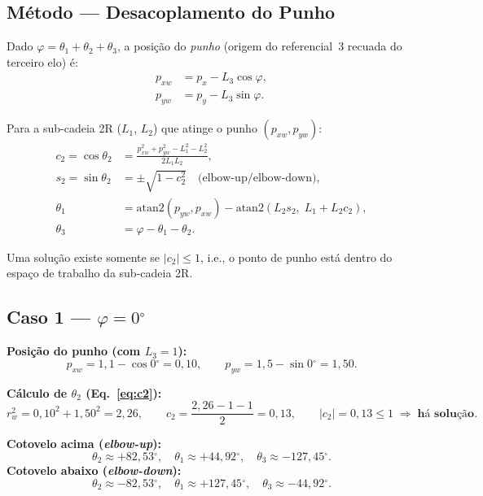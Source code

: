 \documentclass[12pt,a4paper]{article}
\newcommand{\degr}{\ensuremath{^{\circ}}}
\begin{document}
\subsection{M\'etodo --- Desacoplamento do Punho}

Dado $\varphi = \theta_1+\theta_2+\theta_3$, a posi\c{c}\~ao do \emph{punho} (origem
do referencial~3 recuada do terceiro elo) \'e:
\begin{align}
  p_{xw} &= p_x - L_3\cos\varphi, \label{eq:pxw}\\
  p_{yw} &= p_y - L_3\sin\varphi. \label{eq:pyw}
\end{align}

Para a sub-cadeia 2R ($L_1$, $L_2$) que atinge o punho $(p_{xw},p_{yw})$:
\begin{align}
  c_2 = \cos\theta_2 &= \frac{p_{xw}^2 + p_{yw}^2 - L_1^2 - L_2^2}{2L_1L_2}, \label{eq:c2}\\
  s_2 = \sin\theta_2 &= \pm\sqrt{1 - c_2^2}\quad \text{(elbow-up/elbow-down)}, \label{eq:s2}\\
  \theta_1 &= \mathrm{atan2}(p_{yw},p_{xw}) - \mathrm{atan2}(L_2 s_2,\; L_1 + L_2 c_2), \label{eq:t1}\\
  \theta_3 &= \varphi - \theta_1 - \theta_2. \label{eq:t3}
\end{align}

Uma solu\c{c}\~ao existe somente se $|c_2|\leq 1$, i.e., o ponto de punho est\'a dentro
do espa\c{c}o de trabalho da sub-cadeia 2R.

\subsection{Caso 1 --- $\varphi = 0\degr$}

\textbf{Posi\c{c}\~ao do punho (com $L_3=1$):}
\[
  p_{xw} = 1{,}1 - \cos 0\degr = 0{,}10, \qquad p_{yw} = 1{,}5 - \sin 0\degr = 1{,}50.
\]

\textbf{C\'alculo de $\theta_2$ (Eq.~\eqref{eq:c2}):}
\[
  r_w^2 = 0{,}10^2 + 1{,}50^2 = 2{,}26, \qquad
  c_2 = \frac{2{,}26 - 1 - 1}{2} = 0{,}13,
  \qquad |c_2|=0{,}13 \leq 1 \;\Rightarrow\; \textbf{h\'a solu\c{c}\~ao}.
\]

\begin{tcolorbox}[resultbox, title={Solu\c{c}\~oes para $\varphi = 0^{\circ}$}]
\textbf{Cotovelo acima (\textit{elbow-up}):}
\[
  \theta_2 \approx +82{,}53\degr, \quad
  \theta_1 \approx +44{,}92\degr, \quad
  \theta_3 \approx -127{,}45\degr.
\]
\textbf{Cotovelo abaixo (\textit{elbow-down}):}
\[
  \theta_2 \approx -82{,}53\degr, \quad
  \theta_1 \approx +127{,}45\degr, \quad
  \theta_3 \approx -44{,}92\degr.
\]
\end{tcolorbox}
\end{document}
